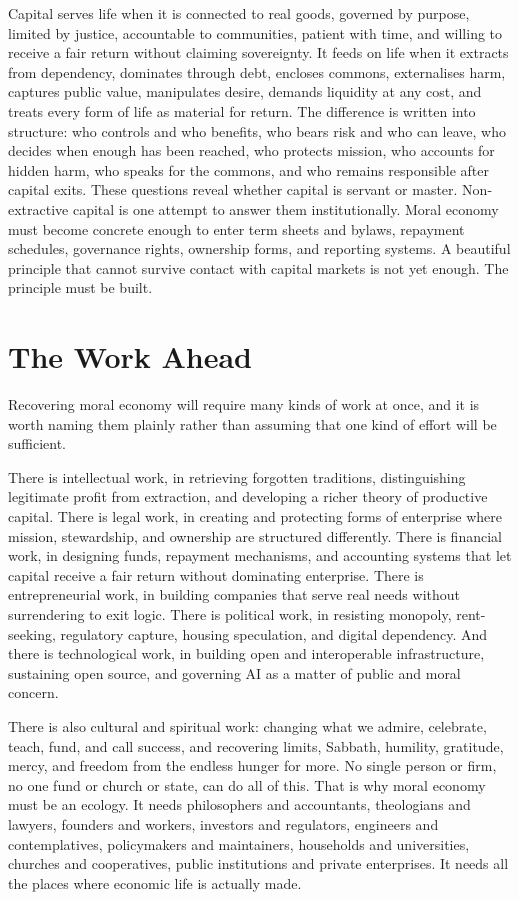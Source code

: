 \documentclass[11pt,a4paper,oneside]{book}
\begin{document}
Capital serves life when it is connected to real goods, governed by purpose, limited by justice, accountable to communities, patient with time, and willing to receive a fair return without claiming sovereignty. It feeds on life when it extracts from dependency, dominates through debt, encloses commons, externalises harm, captures public value, manipulates desire, demands liquidity at any cost, and treats every form of life as material for return. The difference is written into structure: who controls and who benefits, who bears risk and who can leave, who decides when enough has been reached, who protects mission, who accounts for hidden harm, who speaks for the commons, and who remains responsible after capital exits. These questions reveal whether capital is servant or master. Non-extractive capital is one attempt to answer them institutionally. Moral economy must become concrete enough to enter term sheets and bylaws, repayment schedules, governance rights, ownership forms, and reporting systems. A beautiful principle that cannot survive contact with capital markets is not yet enough. The principle must be built.

\section*{The Work Ahead}

Recovering moral economy will require many kinds of work at once, and it is worth naming them plainly rather than assuming that one kind of effort will be sufficient.

There is intellectual work, in retrieving forgotten traditions, distinguishing legitimate profit from extraction, and developing a richer theory of productive capital. There is legal work, in creating and protecting forms of enterprise where mission, stewardship, and ownership are structured differently. There is financial work, in designing funds, repayment mechanisms, and accounting systems that let capital receive a fair return without dominating enterprise. There is entrepreneurial work, in building companies that serve real needs without surrendering to exit logic. There is political work, in resisting monopoly, rent-seeking, regulatory capture, housing speculation, and digital dependency. And there is technological work, in building open and interoperable infrastructure, sustaining open source, and governing AI as a matter of public and moral concern.

There is also cultural and spiritual work: changing what we admire, celebrate, teach, fund, and call success, and recovering limits, Sabbath, humility, gratitude, mercy, and freedom from the endless hunger for more. No single person or firm, no one fund or church or state, can do all of this. That is why moral economy must be an ecology. It needs philosophers and accountants, theologians and lawyers, founders and workers, investors and regulators, engineers and contemplatives, policymakers and maintainers, households and universities, churches and cooperatives, public institutions and private enterprises. It needs all the places where economic life is actually made.
\end{document}
